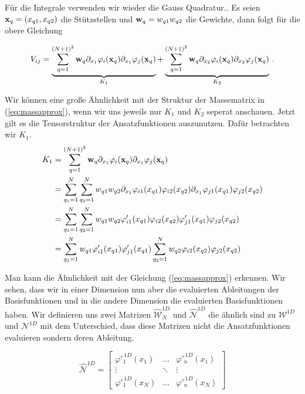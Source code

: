 Für die Integrale verwenden wir wieder die Gauss Quadratur.. Es seien $\bold{x}_q=(x_{q1},x_{q2})$ die Stützstellen und $\bold{w}_q=w_{q1}w_{q2}$ die Gewichte, dann folgt für die obere Gleichung

\begin{equation}
\begin{aligned}
V_{ij}  = \underbrace{\sum\limits_{q=1}^{(N+1)^2} \bold{w}_q \partial_{x_1}  \varphi_i(\bold{x}_q)  \partial_{x_1} \varphi_j (\bold{x}_q)}_{K_1} + \underbrace{\sum\limits_{q=1}^{(N+1)^2} \bold{w}_q  \partial_{x_2} \varphi_i(\bold{x}_q)  \partial_{x_2} \varphi_j(\bold{x}_q)}_{K_2} \, .
\end{aligned}
\end{equation}

Wir können eine große Ähnlichkeit mit der Struktur der Massematrix in (\ref{eq:massapprox}), wenn wir uns jeweils nur $K_1$ und $K_2$ seperat anschauen. Jetzt gilt es die Tensorstruktur der Ansatzfunktionen auszunutzen. Dafür betrachten wir $K_1$.
\begin{equation}
\begin{aligned}
K_1 &=\sum\limits_{q=1}^{(N+1)^2} \bold{w}_q \partial_{x_1}  \varphi_i(\bold{x}_q)  \partial_{x_1} \varphi_j (\bold{x}_q) \\ &= \sum\limits_{q_1=1}^{N} \sum\limits_{q_2=1}^{N} w_{q1}w_{q2} \partial_{x_1}  \varphi_{i1}(x_{q1})\varphi_{i2}(x_{q2})  \partial_{x_1} \varphi_{j1} (x_{q1})\varphi_{j2} (x_{q2}) \\
&=  \sum\limits_{q_1=1}^{N} \sum\limits_{q_2=1}^{N} w_{q1}w_{q2} \varphi'_{i1}(x_{q1})\varphi_{i2}(x_{q2})  \varphi'_{j1} (x_{q1})\varphi_{j2} (x_{q2}) \\ 
&= \sum\limits_{q_1=1}^{N} w_{q1} \varphi'_{i1}(x_{q1}) \varphi'_{j1} (x_{q1}) \sum\limits_{q_2=1}^{N} w_{q2} \varphi_{i2}(x_{q2})  \varphi_{j2} (x_{q2}) 
\end{aligned}
\end{equation}

Man kann die Ähnlichkeit mit der Gleichung (\ref{eq:massapprox}) erkennen. Wir sehen, dass wir in einer Dimension nun aber die evaluierten Ableitungen der Basisfunktionen und in die andere Dimension die evaluierten Basisfunktionen haben.
Wir definieren uns zwei Matrizen $\widehat{\mathcal{W}}^{1D}_N$ und $\widehat{\mathcal{N}}^{1D}$ die ähnlich sind zu $\mathcal{W}^{1D}$ und $\mathcal{N}^{1D}$ mit dem Unterschied, dass diese Matrizen nicht die Ansatzfunktionen evaluieren sondern deren Ableitung.

\begin{equation}
\widehat{\mathcal{N}}^{1D} = 
\begin{bmatrix}
\varphi'^{ \, 1D}_1(x_1) & \hdots &  \varphi'^{ \, 1D}_n(x_1) \\
\vdots & \ddots & \vdots \\
\varphi'^{ \, 1D}_1(x_N)& \hdots & \varphi'^{ \, 1D}_n(x_N)
\end{bmatrix}
\end{equation}

